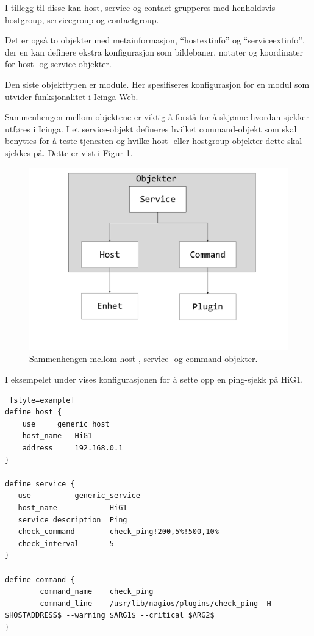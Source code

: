 I tillegg til disse kan host, service og contact grupperes med henholdsvis hostgroup, servicegroup og contactgroup.

Det er også to objekter med metainformasjon, ``hostextinfo'' og ``serviceextinfo'', der en kan definere ekstra konfigurasjon som bildebaner, notater og koordinater for host- og service-objekter.

Den siste objekttypen er module. Her spesifiseres konfigurasjon for en modul som utvider funksjonalitet i Icinga Web.

Sammenhengen mellom objektene er viktig å forstå for å skjønne hvordan sjekker utføres i Icinga. I et service-objekt defineres hvilket command-objekt som skal benyttes for å teste tjenesten og hvilke host- eller hostgroup-objekter dette skal sjekkes på. Dette er vist i Figur \ref{command_host_service}.

\begin{figure}[H]
    \centering
    \includegraphics[scale=0.4]{img/command_host_service}
    \caption{Sammenhengen mellom host-, service- og command-objekter.}
    \label{command_host_service}
\end{figure}
I eksempelet under vises konfigurasjonen for å sette opp en ping-sjekk på HiG1.
\begin{lstlisting} [style=example]
define host {
    use 	generic_host
    host_name	HiG1
    address   	192.168.0.1
}

define service {
   use			generic_service
   host_name            HiG1
   service_description  Ping
   check_command        check_ping!200,5%!500,10%
   check_interval       5
}

define command {
        command_name    check_ping
        command_line    /usr/lib/nagios/plugins/check_ping -H $HOSTADDRESS$ --warning $ARG1$ --critical $ARG2$   
}
\end{lstlisting}
